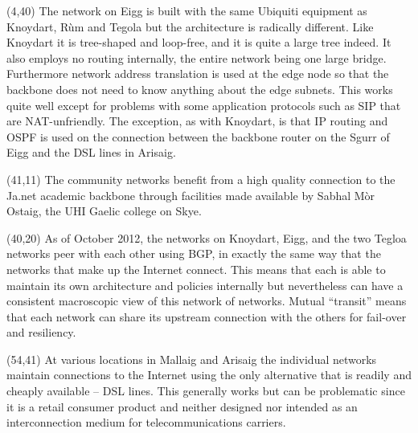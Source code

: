 \documentclass[noborder,onecolumn]{netmap}
\begin{document}
\begin{textblock}{18}(4,40)
  \linespread{1.0}
  \scriptsize
  The network on Eigg is built with the same Ubiquiti equipment as
  Knoydart, R\`um and Tegola but the architecture is radically
  different. Like Knoydart it is tree-shaped and loop-free, and it is
  quite a large tree indeed. It also employs no routing internally,
  the entire network being one large bridge. Furthermore network
  address translation is used at the edge node so that the backbone
  does not need to know anything about the edge subnets. This works
  quite well except for problems with some application protocols 
  such as SIP that are NAT-unfriendly. The exception, as with
  Knoydart, is that IP routing and OSPF is used on the connection
  between the backbone router on the Sgurr of Eigg and the DSL lines
  in Arisaig.  
\end{textblock}
\begin{textblock}{10}(41,11)
  \linespread{1.0}
  \scriptsize
  The community networks benefit from a high quality connection to the
  Ja.net academic backbone through facilities made available by Sabhal
  Mòr Ostaig, the UHI Gaelic college on Skye.
\end{textblock}
\begin{textblock}{10}(40,20)
  \linespread{1.0}
  \scriptsize
  As of October 2012, the networks on Knoydart, Eigg, and the two
  Tegloa networks peer with each other using BGP, in exactly the same
  way that the networks that make up the Internet connect. This means
  that each is able to maintain its own architecture and policies
  internally but nevertheless can have a consistent macroscopic view
  of this network of networks. Mutual ``transit'' means that each
  network can share its upstream connection with the others for
  fail-over and resiliency.
\end{textblock}
\begin{textblock}{12}(54,41)
  \linespread{1.0}
  \scriptsize
  At various locations in Mallaig and Arisaig the individual networks
  maintain connections to the Internet using the only alternative that
  is readily and cheaply available -- DSL lines. This generally works
  but can be problematic since it is a retail consumer product and
  neither designed nor intended as an interconnection medium for
  telecommunications carriers.
\end{textblock}
\end{document}

